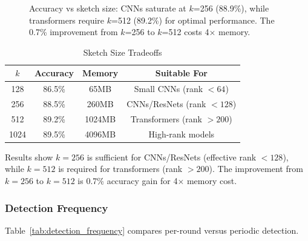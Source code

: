 \begin{figure}[htbp]
\caption{Accuracy vs sketch size: CNNs saturate at $k$=256 (88.9\%), while transformers require $k$=512 (89.2\%) for optimal performance. The 0.7\% improvement from $k$=256 to $k$=512 costs 4$\times$ memory.}
\label{fig:sketch_size}
\end{figure}

\begin{table}[htbp]
\centering
\caption{Sketch Size Tradeoffs}
\label{tab:sketch_size_detail}
\begin{tabular}{|c|c|c|c|}
\hline
\textbf{$k$} & \textbf{Accuracy} & \textbf{Memory} & \textbf{Suitable For} \\
\hline
128 & 86.5\% & 65MB & Small CNNs (rank $<64$) \\
256 & 88.5\% & 260MB & CNNs/ResNets (rank $<128$) \\
512 & 89.2\% & 1024MB & Transformers (rank $>200$) \\
1024 & 89.5\% & 4096MB & High-rank models \\
\hline
\end{tabular}
\end{table}

Results show $k=256$ is sufficient for CNNs/ResNets (effective rank $<128$), while $k=512$ is required for transformers (rank $>200$). The improvement from $k=256$ to $k=512$ is 0.7\% accuracy gain for 4$\times$ memory cost.

\subsubsection{Detection Frequency}

Table~\ref{tab:detection_frequency} compares per-round versus periodic detection.

